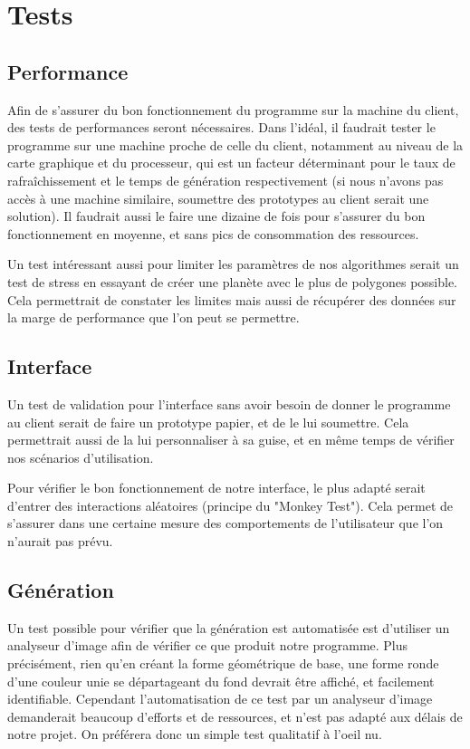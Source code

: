 \documentclass[a4paper]{article}
\begin{document}
\section{Tests}

\subsection{Performance}

Afin de s'assurer du bon fonctionnement du programme sur la machine du client, des tests de performances seront nécessaires. Dans l'idéal, il faudrait tester le programme sur une machine proche de celle du client, notamment au niveau de la carte graphique et du processeur, qui est un facteur déterminant pour le taux de rafraîchissement et le temps de génération respectivement (si nous n'avons pas accès à une machine similaire, soumettre des prototypes au client serait une solution). Il faudrait aussi le faire une dizaine de fois pour s'assurer du bon fonctionnement en moyenne, et sans pics de consommation des ressources.

Un test intéressant aussi pour limiter les paramètres de nos algorithmes serait un test de stress en essayant de créer une planète avec le plus de polygones possible. Cela permettrait de constater les limites mais aussi de récupérer des données sur la marge de performance que l'on peut se permettre.

\subsection{Interface}

Un test de validation pour l'interface sans avoir besoin de donner le programme au client serait de faire un prototype papier, et de le lui soumettre. Cela permettrait aussi de la lui personnaliser à sa guise, et en même temps de vérifier nos scénarios d'utilisation.

Pour vérifier le bon fonctionnement de notre interface, le plus adapté serait d'entrer des interactions aléatoires (principe du "Monkey Test"). Cela permet de s'assurer dans une certaine mesure des comportements de l'utilisateur que l'on n'aurait pas prévu.

\subsection{Génération}

Un test possible pour vérifier que la génération est automatisée est d'utiliser un analyseur d'image afin de vérifier ce que produit notre programme. Plus précisément, rien qu'en créant la forme géométrique de base, une forme ronde d'une couleur unie se départageant du fond devrait être affiché, et facilement identifiable. Cependant l'automatisation de ce test par un analyseur d'image demanderait beaucoup d'efforts et de ressources, et n'est pas adapté aux délais de notre projet. On préférera donc un simple test qualitatif à l'oeil nu.\\
\end{document}

